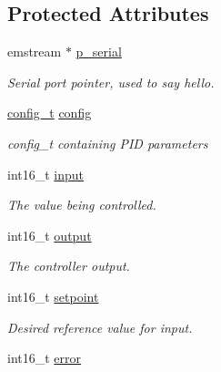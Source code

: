 \subsection*{Protected Attributes}
\begin{DoxyCompactItemize}
\item 
\hypertarget{classpid_a1b4d36263c6184e3390b4f3785e8452e}{emstream $\ast$ \hyperlink{classpid_a1b4d36263c6184e3390b4f3785e8452e}{p\-\_\-serial}}\label{classpid_a1b4d36263c6184e3390b4f3785e8452e}

\begin{DoxyCompactList}\small\item\em Serial port pointer, used to say hello. \end{DoxyCompactList}\item 
\hypertarget{classpid_a3537dd419afdadb7129499c9863f19d9}{\hyperlink{classpid_a13d711458f38f6f9e39baa39a6353a1f}{config\-\_\-t} \hyperlink{classpid_a3537dd419afdadb7129499c9863f19d9}{config}}\label{classpid_a3537dd419afdadb7129499c9863f19d9}

\begin{DoxyCompactList}\small\item\em {\ttfamily config\-\_\-t} containing P\-I\-D parameters \end{DoxyCompactList}\item 
\hypertarget{classpid_a496c88939ef50c0f0664a1d184d6b103}{int16\-\_\-t \hyperlink{classpid_a496c88939ef50c0f0664a1d184d6b103}{input}}\label{classpid_a496c88939ef50c0f0664a1d184d6b103}

\begin{DoxyCompactList}\small\item\em The value being controlled. \end{DoxyCompactList}\item 
\hypertarget{classpid_a3954e25d8e47ad0b6e748d2e5b3680ff}{int16\-\_\-t \hyperlink{classpid_a3954e25d8e47ad0b6e748d2e5b3680ff}{output}}\label{classpid_a3954e25d8e47ad0b6e748d2e5b3680ff}

\begin{DoxyCompactList}\small\item\em The controller output. \end{DoxyCompactList}\item 
\hypertarget{classpid_abed7eadc6bfaee99b3d5ba374a4a8389}{int16\-\_\-t \hyperlink{classpid_abed7eadc6bfaee99b3d5ba374a4a8389}{setpoint}}\label{classpid_abed7eadc6bfaee99b3d5ba374a4a8389}

\begin{DoxyCompactList}\small\item\em Desired reference value for input. \end{DoxyCompactList}\item 
\hypertarget{classpid_a5c9f4364aad5f60f89c10e2fac7deacd}{int16\-\_\-t \hyperlink{classpid_a5c9f4364aad5f60f89c10e2fac7deacd}{error}}\label{classpid_a5c9f4364aad5f60f89c10e2fac7deacd}


\end{DoxyCompactItemize}
